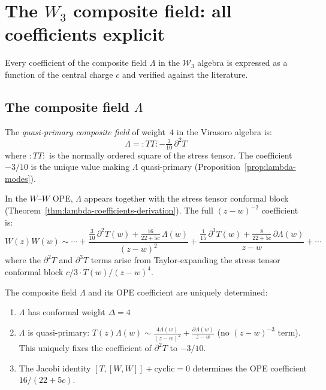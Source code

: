 \section{\texorpdfstring{The $W_3$ composite field: all coefficients explicit}{The W-3 composite field: all coefficients explicit}}
\label{sec:w3-composite-complete}

Every coefficient of the composite field $\Lambda$ in the $\mathcal{W}_3$ algebra is expressed as a function of the central charge $c$ and verified against the literature.

\subsection{\texorpdfstring{The composite field $\Lambda$}{The composite field Lambda}}
\label{subsec:lambda-complete-formula}

\begin{definition}\label{def:lambda-complete}
The \emph{quasi-primary composite field} of weight~$4$ in the Virasoro algebra is:
\begin{equation}\label{eq:lambda-qp}
\Lambda = :TT: - \tfrac{3}{10}\,\partial^2 T
\end{equation}
where $:TT:$ is the normally ordered square of the stress tensor.
The coefficient $-3/10$ is the unique value making $\Lambda$ quasi-primary
(Proposition~\ref{prop:lambda-modes}).

In the $W$--$W$ OPE, $\Lambda$ appears together with the stress tensor conformal block
(Theorem~\ref{thm:lambda-coefficients-derivation}).  The full $(z-w)^{-2}$ coefficient is:
\begin{equation}
W(z)W(w) \sim \cdots + \frac{\tfrac{3}{10}\,\partial^2 T(w) + \tfrac{16}{22+5c}\,\Lambda(w)}{(z-w)^2}
+ \frac{\tfrac{1}{15}\,\partial^3 T(w) + \tfrac{8}{22+5c}\,\partial\Lambda(w)}{z-w} + \cdots
\end{equation}
where the $\partial^2 T$ and $\partial^3 T$ terms arise from Taylor-expanding the stress tensor conformal block $c/3 \cdot T(w)/(z-w)^4$.
\end{definition}

\begin{theorem}\label{thm:lambda-coefficients-derivation}
The composite field $\Lambda$ and its OPE coefficient are uniquely determined:
\begin{enumerate}
\item $\Lambda$ has conformal weight $\Delta = 4$
\item $\Lambda$ is quasi-primary: $T(z)\Lambda(w) \sim \frac{4\Lambda(w)}{(z-w)^2}
+ \frac{\partial\Lambda(w)}{z-w}$ (no $(z-w)^{-3}$ term).
This uniquely fixes the coefficient of $\partial^2 T$ to $-3/10$.
\item The Jacobi identity $[T, [W, W]] + \text{cyclic} = 0$ determines
the OPE coefficient $16/(22+5c)$.
\end{enumerate}
\end{theorem}

